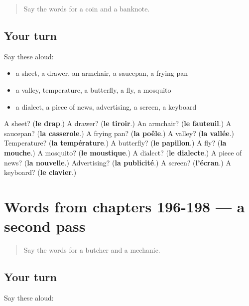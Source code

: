 \label{lesson:FR-R198-first-pass-words-from-chapters-193-195}



\begin{quote}
Say the words for a coin and a banknote.
\end{quote}

\subsection*{Your turn}
Say these aloud:

\begin{itemize}
\raggedright
  \item a sheet, a drawer, an armchair, a saucepan, a frying pan
  \item a valley, temperature, a butterfly, a fly, a mosquito
  \item a dialect, a piece of news, advertising, a screen, a keyboard
\end{itemize}

\begin{tcolorbox}[breakable,colback=teal!4,colframe=teal!35!black,title={Before you move on}]
A sheet? (\textbf{le drap}.) A drawer? (\textbf{le tiroir}.) An armchair? (\textbf{le fauteuil}.) A saucepan? (\textbf{la casserole}.) A frying pan? (\textbf{la poêle}.) A valley? (\textbf{la vallée}.) Temperature? (\textbf{la température}.) A butterfly? (\textbf{le papillon}.) A fly? (\textbf{la mouche}.) A mosquito? (\textbf{le moustique}.) A dialect? (\textbf{le dialecte}.) A piece of news? (\textbf{la nouvelle}.) Advertising? (\textbf{la publicité}.) A screen? (\textbf{l'écran}.) A keyboard? (\textbf{le clavier}.)
\end{tcolorbox}
\section[(dialogue)]{Words from chapters 196-198 — a second pass}

\label{lesson:FR-R198-second-pass-words-from-chapters-196-198}



\begin{quote}
Say the words for a butcher and a mechanic.
\end{quote}

\subsection*{Your turn}
Say these aloud:

